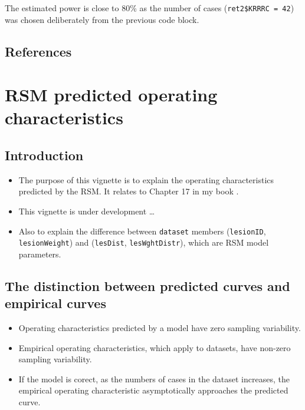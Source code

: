 \documentclass[]{book}
\providecommand{\tightlist}{%
  \setlength{\itemsep}{0pt}\setlength{\parskip}{0pt}}
\begin{document}
The estimated power is close to 80\% as the number of cases (\texttt{ret2\$KRRRC\ =\ 42}) was chosen deliberately from the previous code block.

\hypertarget{references-10}{%
\section{References}\label{references-10}}

\hypertarget{RsmOpCh}{%
\chapter{RSM predicted operating characteristics}\label{RsmOpCh}}

\hypertarget{introduction-13}{%
\section{Introduction}\label{introduction-13}}

\begin{itemize}
\tightlist
\item
  The purpose of this vignette is to explain the operating characteristics predicted by the RSM. It relates to Chapter 17 in my book \citep{RN2680}.
\item
  This vignette is under development \ldots{}
\item
  Also to explain the difference between \texttt{dataset} members (\texttt{lesionID}, \texttt{lesionWeight}) and (\texttt{lesDist}, \texttt{lesWghtDistr}), which are RSM model parameters.
\end{itemize}

\hypertarget{the-distinction-between-predicted-curves-and-empirical-curves}{%
\section{The distinction between predicted curves and empirical curves}\label{the-distinction-between-predicted-curves-and-empirical-curves}}

\begin{itemize}
\tightlist
\item
  Operating characteristics predicted by a model have zero sampling variability.\\
\item
  Empirical operating characteristics, which apply to datasets, have non-zero sampling variability.
\item
  If the model is corect, as the numbers of cases in the dataset increases, the empirical operating characteristic asymptotically approaches the predicted curve.
\end{itemize}
\end{document}
